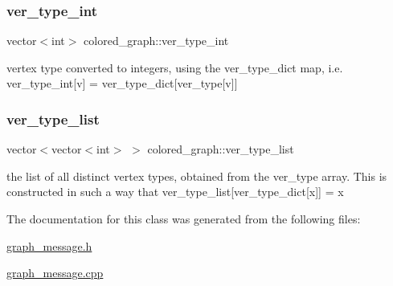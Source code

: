 \subsubsection{\texorpdfstring{ver\+\_\+type\+\_\+int}{ver\_type\_int}}
{\footnotesize\ttfamily vector$<$int$>$ colored\+\_\+graph\+::ver\+\_\+type\+\_\+int}



vertex type converted to integers, using the ver\+\_\+type\+\_\+dict map, i.\+e. ver\+\_\+type\+\_\+int\mbox{[}v\mbox{]} = ver\+\_\+type\+\_\+dict\mbox{[}ver\+\_\+type\mbox{[}v\mbox{]}\mbox{]} 

\mbox{\label{classcolored__graph_a3a1ae8abac458d20a2afb4aa48bbc956}} 
\subsubsection{\texorpdfstring{ver\+\_\+type\+\_\+list}{ver\_type\_list}}
{\footnotesize\ttfamily vector$<$vector$<$int$>$ $>$ colored\+\_\+graph\+::ver\+\_\+type\+\_\+list}



the list of all distinct vertex types, obtained from the ver\+\_\+type array. This is constructed in such a way that ver\+\_\+type\+\_\+list\mbox{[}ver\+\_\+type\+\_\+dict\mbox{[}x\mbox{]}\mbox{]} = x 



The documentation for this class was generated from the following files\+:\begin{DoxyCompactItemize}
\item 
\hyperlink{graph__message_8h}{graph\+\_\+message.\+h}\item 
\hyperlink{graph__message_8cpp}{graph\+\_\+message.\+cpp}\end{DoxyCompactItemize}
